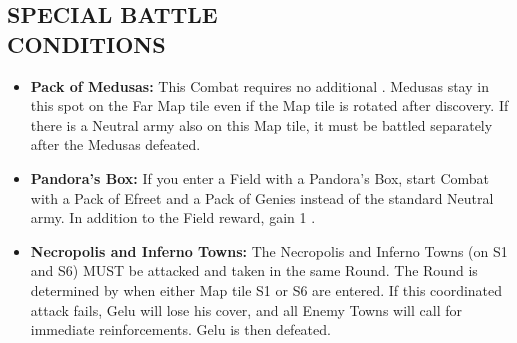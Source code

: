 \begin{multicols*}{2}
\subsection*{\MakeUppercase{Special Battle\\Conditions}}

\begin{itemize}
  \item \textbf{Pack of Medusas:} This Combat requires no additional .
    Medusas stay in this spot on the Far Map tile even if the Map tile is rotated after discovery.
    If there is a Neutral army also on this Map tile, it must be battled separately after the Medusas defeated.
  \item \textbf{Pandora’s Box:} If you enter a Field with a Pandora’s Box, start Combat with a Pack of Efreet and a Pack of Genies instead of the standard Neutral army.
    In addition to the Field reward, gain 1 .
  \item \textbf{Necropolis and Inferno Towns:} The Necropolis and Inferno Towns (on S1 and S6) MUST be attacked and taken in the same Round.
    The Round is determined by when either Map tile S1 or S6 are entered.
    If this coordinated attack fails, Gelu will lose his cover, and all Enemy Towns will call for immediate reinforcements.
    Gelu is then defeated.
\end{itemize}


\vspace*{\fill}
\begin{center}
\end{center}
\vspace*{\fill}

\end{multicols*}

